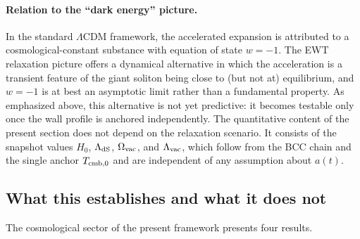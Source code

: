 \documentclass[10pt,a4paper]{article}
\begin{document}
\paragraph{Relation to the ``dark energy'' picture.} In the standard
\(\Lambda\)CDM framework, the accelerated expansion is attributed to
a cosmological-constant substance with equation of state
\(w = -1\). The EWT relaxation picture offers a dynamical
alternative in which the acceleration is a transient feature of the
giant soliton being close to (but not at) equilibrium, and
\(w = -1\) is at best an asymptotic limit rather than a fundamental
property. As emphasized above, this alternative is not yet
predictive: it becomes testable only once the wall profile is
anchored independently. The quantitative content of the present
section does not depend on the relaxation scenario. It consists of
the snapshot values \(H_0\), \(\Lambda_{\rm dS}\),
\(\Omega_{\rm vac}\), and \(\Lambda_{\rm vac}\), which follow from
the BCC chain and the single anchor \(T_{\rm cmb,0}\) and are
independent of any assumption about \(a(t)\).

\subsection{What this establishes and what it does not}

The cosmological sector of the present framework presents four
results.
\end{document}
